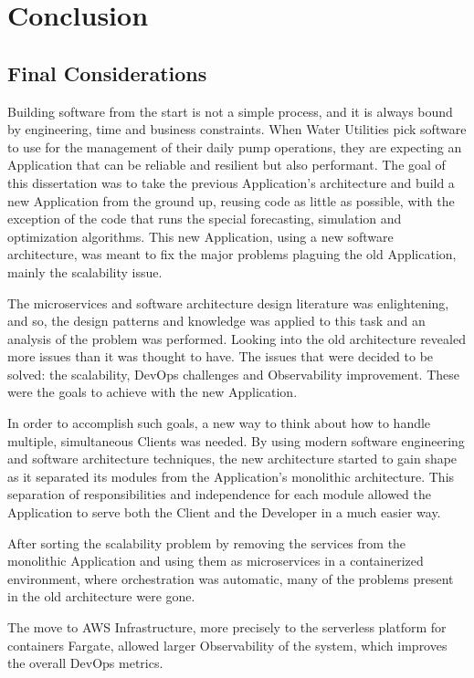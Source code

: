\chapter{Conclusion}\label{conclusion}

\section{Final Considerations}\label{conclusion:s:final-considerations}

Building software from the start is not a simple process, and it is always bound by engineering, time and business constraints. When Water Utilities pick software to use for the management of their daily pump operations, they are expecting an Application that can be reliable and resilient but also performant. 
The goal of this dissertation was to take the previous Application's architecture and build a new Application from the ground up, reusing code as little as possible, with the exception of the code that runs the special forecasting, simulation and optimization algorithms. This new Application, using a new software architecture, was meant to fix the major problems plaguing the old Application, mainly the scalability issue.

The microservices and software architecture design literature was enlightening, and so, the design patterns and knowledge was applied to this task and an analysis of the problem was performed.
Looking into the old architecture revealed more issues than it was thought to have. The issues that were decided to be solved: the scalability, DevOps challenges and Observability improvement. These were the goals to achieve with the new Application.

In order to accomplish such goals, a new way to think about how to handle multiple, simultaneous Clients was needed. By using modern software engineering and software architecture techniques, the new architecture started to gain shape as it separated its modules from the Application's monolithic architecture. This separation of responsibilities and independence for each module allowed the Application to serve both the Client and the Developer in a much easier way.

After sorting the scalability problem by removing the services from the monolithic Application and using them as microservices in a containerized environment, where orchestration was automatic, many of the problems present in the old architecture were gone.

The move to AWS Infrastructure, more precisely to the serverless platform for containers Fargate, allowed larger Observability of the system, which improves the overall DevOps metrics.

